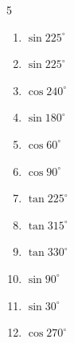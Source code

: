 \begin{multicols}{5}
\begin{enumerate}

  \item $\displaystyle \sin{225^\circ}$


  \item $\displaystyle \sin{225^\circ}$


  \item $\displaystyle \cos{240^\circ}$


  \item $\displaystyle \sin{180^\circ}$

        \phantom{$\displaystyle =0$}

  \item $\displaystyle \cos{60^\circ}$


\columnbreak %

  \item $\displaystyle \cos{90^\circ}$

        \phantom{$\displaystyle =0$}

  \item $\displaystyle \tan{225^\circ}$

        \phantom{$\displaystyle =1$}

  \item $\displaystyle \tan{315^\circ}$

        \phantom{$\displaystyle =-1$}

  \item $\displaystyle \tan{330^\circ}$


  \item $\displaystyle \sin{90^\circ}$

        \phantom{$\displaystyle =1$}

  \item $\displaystyle \sin{30^\circ}$


  \item $\displaystyle \cos{270^\circ}$

        \phantom{$\displaystyle =0$}


\end{enumerate}
\end{multicols}
